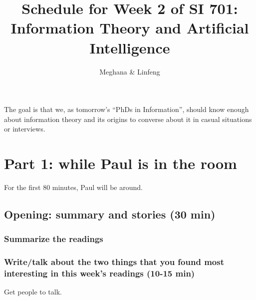 \documentclass[12pt]{article}
\title{Schedule for Week 2 of SI 701: \\Information Theory and Artificial
Intelligence}
\author{Meghana \& Linfeng }
\theoremstyle{definition}
\theoremstyle{plain}
\begin{document}
\maketitle

The goal is that we, as tomorrow's ``PhDs in Information'', should know enough about information theory and its origins to converse about it in casual situations or interviews.

\section{Part 1: while Paul is in the room}
For the first 80 minutes, Paul will be around.

\subsection{Opening: summary and stories (30 min)}
\subsubsection{Summarize the readings}
\subsubsection{Write/talk about the two things that you found most interesting in this week's readings (10-15 min)}
Get people to talk.
\end{document}
